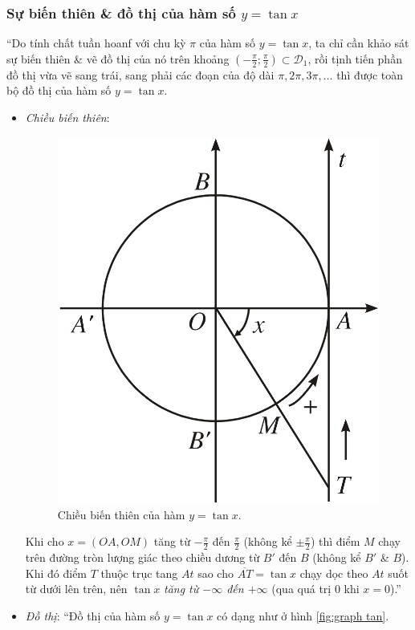 \documentclass[oneside]{book}
\numberwithin{equation}{section}
\begin{document}
\subsubsection{Sự biến thiên \& đồ thị của hàm số $y = \tan x$}
``Do tính chất tuần hoanf với chu kỳ $\pi$ của hàm số $y = \tan x$, ta chỉ cần khảo sát sự biến thiên \& vẽ đồ thị của nó trên khoảng $\left(-\frac{\pi}{2};\frac{\pi}{2}\right)\subset\mathcal{D}_1$, rồi tịnh tiến phần đồ thị vừa vẽ sang trái, sang phải các đoạn của độ dài $\pi,2\pi,3\pi,\ldots$ thì được toàn bộ đồ thị của hàm số $y = \tan x$.
\begin{itemize}
	\item \textit{Chiều biến thiên}:
	
	\begin{figure}[H]
		\centering
		\includegraphics[scale=0.15]{chieu_bien_thien_tan}
		\caption{Chiều biến thiên của hàm $y = \tan x$.}
		\label{fig:chieu bien thien tan}
	\end{figure}
	Khi cho $x = (OA,OM)$ tăng từ $-\frac{\pi}{2}$ đến $\frac{\pi}{2}$ (không kể $\pm\frac{\pi}{2}$) thì điểm $M$ chạy trên đường tròn lượng giác theo chiều dương từ $B'$ đến $B$ (không kể $B'$ \& $B$). Khi đó điểm $T$ thuộc trục tang $At$ sao cho $\overline{AT} = \tan x$ chạy dọc theo $At$ suốt từ dưới lên trên, nên $\tan x$ \textit{tăng từ $-\infty$ đến $+\infty$} (qua quá trị $0$ khi $x = 0$).''
	\item \textit{Đồ thị}: ``Đồ thị của hàm số $y = \tan x$ có dạng như ở hình \ref{fig:graph tan}.
	

\end{itemize}
\end{document}

